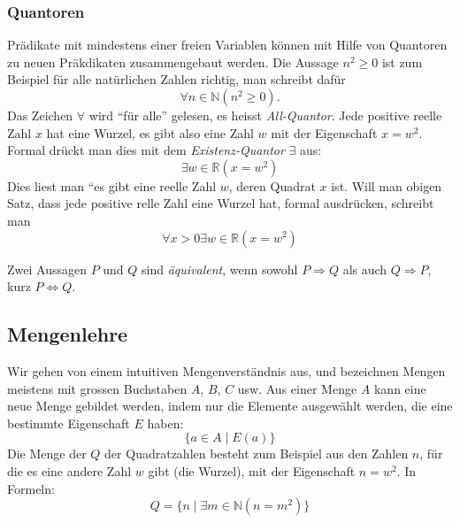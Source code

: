 \subsubsection{Quantoren}
%
Prädikate mit mindestens einer freien Variablen können mit Hilfe
von Quantoren zu neuen Präkdikaten zusammengebaut werden. 
Die Aussage $n^2\ge 0$ ist zum Beispiel für alle natürlichen
Zahlen richtig, man schreibt dafür
\[
\forall n\in\mathbb N(n^2\ge 0).
\]
%
Das Zeichen $\forall$ wird ``für alle'' gelesen, es heisst
{\em All-Quantor}.
%
Jede positive reelle Zahl $x$ hat eine Wurzel, es gibt also eine
Zahl $w$ mit der Eigenschaft $x=w^2$. Formal drückt man dies mit
dem {\em Existenz-Quantor} $\exists$ aus:
\[
\exists w\in\mathbb R(x =w^2)
\]
Dies liest man ``es gibt eine reelle Zahl $w$, deren Quadrat $x$ ist.
Will man obigen Satz, dass jede positive relle Zahl eine Wurzel hat,
formal ausdrücken, schreibt man
\[
\forall x>0\exists w\in\mathbb R(x=w^2)
\]

Zwei Aussagen $P$ und $Q$ sind {\em äquivalent}, wenn sowohl
$P\Rightarrow Q$ als auch $Q\Rightarrow P$, kurz $P\Leftrightarrow Q$.

\subsection{Mengenlehre}
%
Wir gehen von einem intuitiven Mengenverständnis aus, und bezeichnen
Mengen meistens mit grossen Buchstaben $A$, $B$, $C$ usw.
Aus einer Menge $A$ kann eine neue Menge gebildet werden, indem
nur die Elemente ausgewählt werden, die eine bestimmte Eigenschaft
$E$ haben:
\[
\{a\in A\;|\;E(a)\}
\]
Die Menge der $Q$ der Quadratzahlen besteht zum Beispiel aus den
Zahlen $n$, für
die es eine andere Zahl $w$ gibt (die Wurzel), mit der Eigenschaft
$n=w^2$.  In Formeln:
\[
Q=\{n\; |\; \exists m\in\mathbb N(n=m^2)\}
\]

